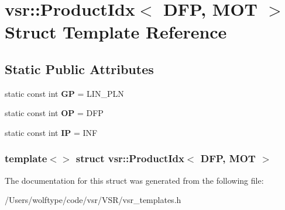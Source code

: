 \hypertarget{structvsr_1_1_product_idx_3_01_d_f_p_00_01_m_o_t_01_4}{\section{vsr\-:\-:Product\-Idx$<$ D\-F\-P, M\-O\-T $>$ Struct Template Reference}
\label{structvsr_1_1_product_idx_3_01_d_f_p_00_01_m_o_t_01_4}
}
\subsection*{Static Public Attributes}
\begin{DoxyCompactItemize}
\item 
\hypertarget{structvsr_1_1_product_idx_3_01_d_f_p_00_01_m_o_t_01_4_ae9b54b5da2afcb16f5eb0985a799d985}{static const int {\bfseries G\-P} = L\-I\-N\-\_\-\-P\-L\-N}\label{structvsr_1_1_product_idx_3_01_d_f_p_00_01_m_o_t_01_4_ae9b54b5da2afcb16f5eb0985a799d985}

\item 
\hypertarget{structvsr_1_1_product_idx_3_01_d_f_p_00_01_m_o_t_01_4_af4a5355e3d4a9fde60d7b3348d8572a8}{static const int {\bfseries O\-P} = D\-F\-P}\label{structvsr_1_1_product_idx_3_01_d_f_p_00_01_m_o_t_01_4_af4a5355e3d4a9fde60d7b3348d8572a8}

\item 
\hypertarget{structvsr_1_1_product_idx_3_01_d_f_p_00_01_m_o_t_01_4_aaf48455a05ca9eea1abc08a9bbb52f10}{static const int {\bfseries I\-P} = I\-N\-F}\label{structvsr_1_1_product_idx_3_01_d_f_p_00_01_m_o_t_01_4_aaf48455a05ca9eea1abc08a9bbb52f10}

\end{DoxyCompactItemize}
\subsubsection*{template$<$$>$ struct vsr\-::\-Product\-Idx$<$ D\-F\-P, M\-O\-T $>$}



The documentation for this struct was generated from the following file\-:\begin{DoxyCompactItemize}
\item 
/\-Users/wolftype/code/vsr/\-V\-S\-R/vsr\-\_\-templates.\-h\end{DoxyCompactItemize}

